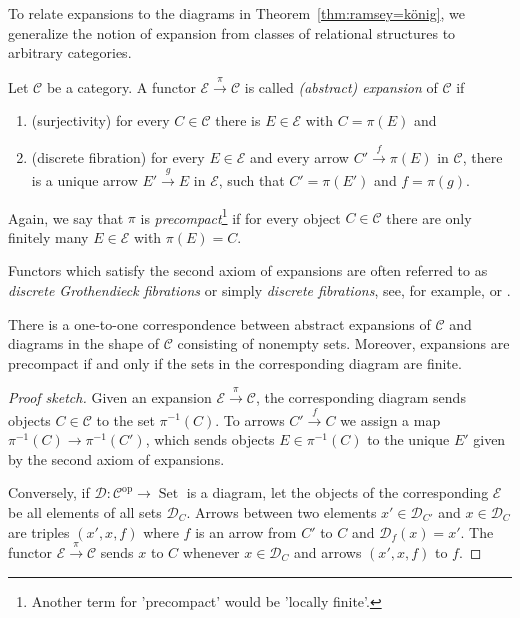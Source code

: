 \documentclass[preprint,12pt]{elsarticle}
\newcommand{\cat}[1]{\mathcal{#1}}
\newcommand{\op}{^{\mathop{op}}}
\DeclareMathOperator{\Set}{Set}
\begin{document}
To relate expansions to the diagrams in Theorem~\ref{thm:ramsey=könig}, we generalize the notion of expansion from classes of relational structures to arbitrary categories.

\begin{defin}
\label{def:expansions}
    Let $\cat C$ be a category. A functor $\cat E\xrightarrow{\pi}\cat C$ is called \emph{(abstract) expansion} of $\cat C$ if
    \begin{enumerate}
        \item (surjectivity) for every $C\in\cat C $ there is $E\in\cat E$ with $C=\pi(E)$ and 
        \item (discrete fibration) for every $E\in \cat E$ and every arrow $C'\xrightarrow{f} \pi(E)$ in $\cat C$, there is a unique arrow $E'\xrightarrow{g}E$ in $\cat E$, such that $C'=\pi(E')$ and $f=\pi(g)$.
    \end{enumerate}
    Again, we say that $\pi$ is \emph{precompact}\footnote{Another term for 'precompact' would be 'locally finite'.} if for every object $C\in\cat C$ there are only finitely many $E\in\cat E$ with $\pi(E)=C$.
\end{defin}



Functors which satisfy the second axiom of expansions are often referred to as \emph{discrete Grothendieck fibrations} or simply \emph{discrete fibrations}, see, for example, \cite{LoregianRiehl2020fibrations} or \cite[Section~2.4]{Riehl2016context}.


\begin{lem}
\label{lem:discreteGrothendieck}
    There is a one-to-one correspondence between abstract expansions of $\cat C$ and diagrams in the shape of $\cat C$ consisting of nonempty sets. Moreover, expansions are precompact if and only if the sets in the corresponding diagram are finite.
\end{lem}


\begin{proof}[Proof sketch]
    Given an expansion $\cat E\xrightarrow{\pi}\cat C$, the corresponding diagram sends objects $C\in\cat C$ to the set $\pi^{-1}(C)$. To arrows $C'\xrightarrow{f}C$ we assign a map $\pi^{-1}(C)\to \pi^{-1}(C')$, which sends objects $E\in\pi^{-1}(C)$ to the unique $E'$ given by the second axiom of expansions.

    Conversely, if $\cat D:\cat C\op\to\Set$ is a diagram, let the objects of the corresponding $\cat E$ be all elements of all sets $\cat D_C$.
    Arrows between two elements $x'\in\cat D_{C'}$ and $x\in\cat D_C$ are triples $(x',x, f)$ where $f$ is an arrow from $C'$ to $C$ and $\cat D_f(x)=x'$.
    The functor $\cat E\xrightarrow{\pi}\cat C$ sends $x$ to $C$ whenever $x\in\cat D_C$ and arrows $(x',x,f)$ to $f$. 
\end{proof}
\end{document}
